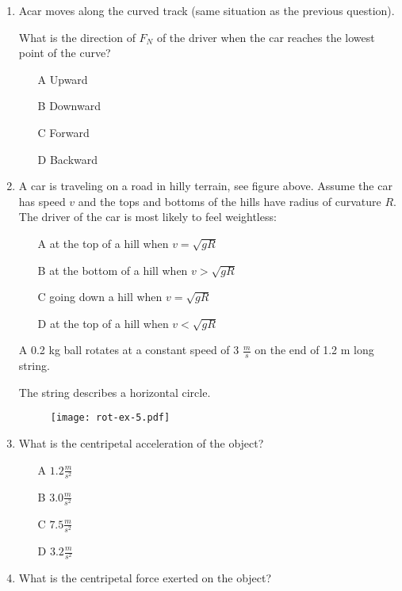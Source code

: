 \begin{enumerate}
\item Acar moves along the curved track (same situation as the previous question).

What is the direction of $F_N$ of the driver when the car reaches the lowest point of the curve?

\begin{itemize}
\item[A] Upward
\item[B] Downward
\item[C] Forward
\item[D] Backward
\end{itemize}


\item A car is traveling on a road in hilly terrain, see figure above.
Assume the car has speed $v$ and the tops and bottoms of the hills have radius of curvature $R$.
The driver of the car is most likely to feel weightless:

\begin{itemize}
\item[A] at the top of a hill when $v = \sqrt{gR}$
\item[B] at the bottom of a hill when $v > \sqrt{gR}$
\item[C] going down a hill when $v = \sqrt{gR}$
\item[D] at the top of a hill when $v < \sqrt{gR}$
\end{itemize}

\vspace{1cm}

A 0.2 kg ball rotates at a constant speed of 3 $\frac{m}{s}$ on the end of 1.2 m long string.

The string describes a horizontal circle.

\begin{figure}[H]
\centering
\texttt{[image: rot-ex-5.pdf]}
\end{figure}

\item What is the centripetal acceleration of the object?

\begin{itemize}
\item[A] $1.2 \frac{m}{s^2}$
\item[B] $3.0 \frac{m}{s^2}$
\item[C] $7.5 \frac{m}{s^2}$
\item[D] $3.2 \frac{m}{s^2}$
\end{itemize}


\item What is the centripetal force exerted on the object?


\end{enumerate}
